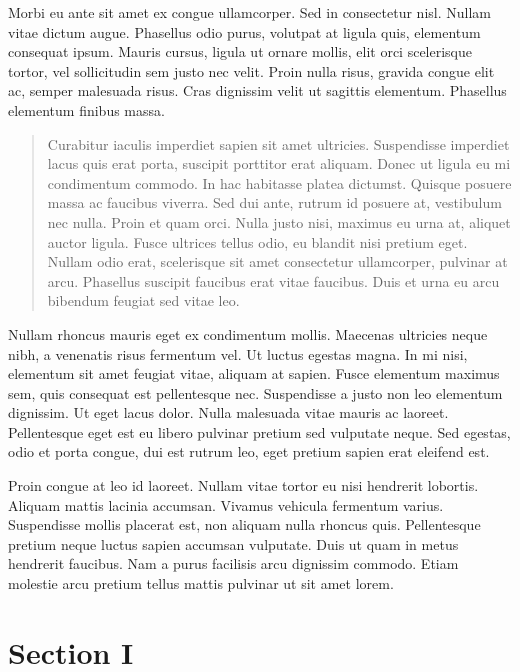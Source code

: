 Morbi eu ante sit amet ex congue ullamcorper. Sed in consectetur nisl. Nullam vitae dictum augue. Phasellus odio purus, volutpat at ligula quis, elementum consequat ipsum. Mauris cursus, ligula ut ornare mollis, elit orci scelerisque tortor, vel sollicitudin sem justo nec velit. Proin nulla risus, gravida congue elit ac, semper malesuada risus. Cras dignissim velit ut sagittis elementum. Phasellus elementum finibus massa.

\begin{quote}

Curabitur iaculis imperdiet sapien sit amet ultricies. Suspendisse imperdiet lacus quis erat porta, suscipit porttitor erat aliquam. Donec ut ligula eu mi condimentum commodo. In hac habitasse platea dictumst. Quisque posuere massa ac faucibus viverra. Sed dui ante, rutrum id posuere at, vestibulum nec nulla. Proin et quam orci. Nulla justo nisi, maximus eu urna at, aliquet auctor ligula. Fusce ultrices tellus odio, eu blandit nisi pretium eget. Nullam odio erat, scelerisque sit amet consectetur ullamcorper, pulvinar at arcu. Phasellus suscipit faucibus erat vitae faucibus. Duis et urna eu arcu bibendum feugiat sed vitae leo.~%
\end{quote}

Nullam rhoncus mauris eget ex condimentum mollis. Maecenas ultricies neque nibh, a venenatis risus fermentum vel. Ut luctus egestas magna. In mi nisi, elementum sit amet feugiat vitae, aliquam at sapien. Fusce elementum maximus sem, quis consequat est pellentesque nec. Suspendisse a justo non leo elementum dignissim. Ut eget lacus dolor. Nulla malesuada vitae mauris ac laoreet. Pellentesque eget est eu libero pulvinar pretium sed vulputate neque. Sed egestas, odio et porta congue, dui est rutrum leo, eget pretium sapien erat eleifend est.

Proin congue at leo id laoreet. Nullam vitae tortor eu nisi hendrerit lobortis. Aliquam mattis lacinia accumsan. Vivamus vehicula fermentum varius. Suspendisse mollis placerat est, non aliquam nulla rhoncus quis. Pellentesque pretium neque luctus sapien accumsan vulputate. Duis ut quam in metus hendrerit faucibus. Nam a purus facilisis arcu dignissim commodo. Etiam molestie arcu pretium tellus mattis pulvinar ut sit amet lorem. 

\section{Section I}
\label{sectioni}

